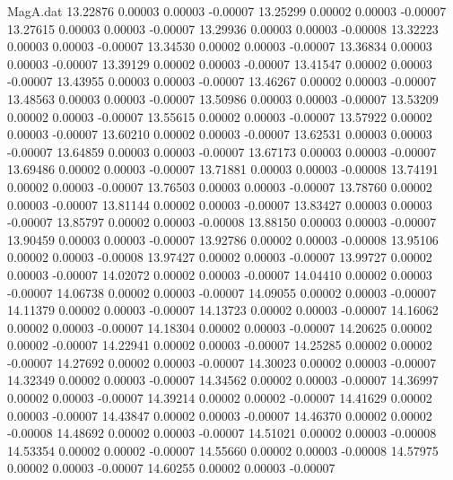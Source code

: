 \begin{filecontents}{MagA.dat}
  13.22876    0.00003    0.00003   -0.00007
  13.25299    0.00002    0.00003   -0.00007
  13.27615    0.00003    0.00003   -0.00007
  13.29936    0.00003    0.00003   -0.00008
  13.32223    0.00003    0.00003   -0.00007
  13.34530    0.00002    0.00003   -0.00007
  13.36834    0.00003    0.00003   -0.00007
  13.39129    0.00002    0.00003   -0.00007
  13.41547    0.00002    0.00003   -0.00007
  13.43955    0.00003    0.00003   -0.00007
  13.46267    0.00002    0.00003   -0.00007
  13.48563    0.00003    0.00003   -0.00007
  13.50986    0.00003    0.00003   -0.00007
  13.53209    0.00002    0.00003   -0.00007
  13.55615    0.00002    0.00003   -0.00007
  13.57922    0.00002    0.00003   -0.00007
  13.60210    0.00002    0.00003   -0.00007
  13.62531    0.00003    0.00003   -0.00007
  13.64859    0.00003    0.00003   -0.00007
  13.67173    0.00003    0.00003   -0.00007
  13.69486    0.00002    0.00003   -0.00007
  13.71881    0.00003    0.00003   -0.00008
  13.74191    0.00002    0.00003   -0.00007
  13.76503    0.00003    0.00003   -0.00007
  13.78760    0.00002    0.00003   -0.00007
  13.81144    0.00002    0.00003   -0.00007
  13.83427    0.00003    0.00003   -0.00007
  13.85797    0.00002    0.00003   -0.00008
  13.88150    0.00003    0.00003   -0.00007
  13.90459    0.00003    0.00003   -0.00007
  13.92786    0.00002    0.00003   -0.00008
  13.95106    0.00002    0.00003   -0.00008
  13.97427    0.00002    0.00003   -0.00007
  13.99727    0.00002    0.00003   -0.00007
  14.02072    0.00002    0.00003   -0.00007
  14.04410    0.00002    0.00003   -0.00007
  14.06738    0.00002    0.00003   -0.00007
  14.09055    0.00002    0.00003   -0.00007
  14.11379    0.00002    0.00003   -0.00007
  14.13723    0.00002    0.00003   -0.00007
  14.16062    0.00002    0.00003   -0.00007
  14.18304    0.00002    0.00003   -0.00007
  14.20625    0.00002    0.00002   -0.00007
  14.22941    0.00002    0.00003   -0.00007
  14.25285    0.00002    0.00002   -0.00007
  14.27692    0.00002    0.00003   -0.00007
  14.30023    0.00002    0.00003   -0.00007
  14.32349    0.00002    0.00003   -0.00007
  14.34562    0.00002    0.00003   -0.00007
  14.36997    0.00002    0.00003   -0.00007
  14.39214    0.00002    0.00002   -0.00007
  14.41629    0.00002    0.00003   -0.00007
  14.43847    0.00002    0.00003   -0.00007
  14.46370    0.00002    0.00002   -0.00008
  14.48692    0.00002    0.00003   -0.00007
  14.51021    0.00002    0.00003   -0.00008
  14.53354    0.00002    0.00002   -0.00007
  14.55660    0.00002    0.00003   -0.00008
  14.57975    0.00002    0.00003   -0.00007
  14.60255    0.00002    0.00003   -0.00007

\end{filecontents}
